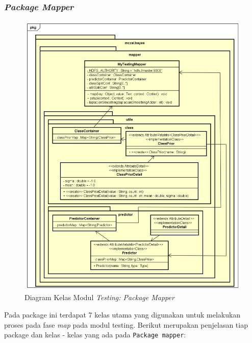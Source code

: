 \subsubsection{\textit{Package Mapper}}
\begin{figure}[H]
	\centering
	\includegraphics[scale=0.6]{ClassDiagramLengkap/CD_Test_Mapper}
	\caption[Diagram Kelas Modul \textit{Testing: Package Mapper}]{Diagram Kelas Modul \textit{Testing: Package Mapper}}
	\label{fig:Diagram Kelas Modul Testing: Package Mapper}
\end{figure}
Pada package ini terdapat 7 kelas utama yang digunakan untuk melakukan proses pada fase \textit{map} pada modul testing. Berikut merupakan penjelasan tiap package dan kelas - kelas yang ada pada \texttt{Package mapper}:
